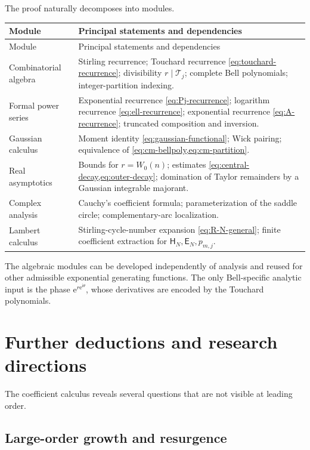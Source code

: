 \documentclass[11pt,a4paper]{article}
\theoremstyle{definition}
\theoremstyle{remark}
\newcommand{\Tch}{\mathscr T}
\newcommand{\ii}{\mathrm i}
\newcommand{\ee}{\mathrm e}
\newcommand{\cH}{\mathsf H}
\newcommand{\cE}{\mathsf E}
\begin{document}
The proof naturally decomposes into modules.
\begin{longtable}{p{}p{}}
\toprule
Module & Principal statements and dependencies\\
\midrule
\endfirsthead
\toprule
Module & Principal statements and dependencies\\
\midrule
\endhead
Combinatorial algebra & Stirling recurrence; Touchard recurrence
\cref{eq:touchard-recurrence}; divisibility \(r\mid\Tch_j\); complete Bell
polynomials; integer-partition indexing.\\[2pt]
Formal power series & Exponential recurrence \cref{eq:Pj-recurrence}; logarithm
recurrence \cref{eq:ell-recurrence}; exponential recurrence
\cref{eq:A-recurrence}; truncated composition and inversion.\\[2pt]
Gaussian calculus & Moment identity \cref{eq:gaussian-functional}; Wick pairing;
equivalence of \cref{eq:cm-bellpoly,eq:cm-partition}.\\[2pt]
Real asymptotics & Bounds for \(r=W_0(n)\); estimates
\cref{eq:central-decay,eq:outer-decay}; domination of Taylor remainders by a
Gaussian integrable majorant.\\[2pt]
Complex analysis & Cauchy's coefficient formula; parameterization of the
saddle circle; complementary-arc localization.\\[2pt]
Lambert calculus & Stirling-cycle-number expansion
\cref{eq:R-N-general}; finite coefficient extraction for
\(\cH_N,\cE_N,p_{m,j}\).\\
\bottomrule
\end{longtable}
The algebraic modules can be developed independently of analysis and reused
for other admissible exponential generating functions.  The only Bell-specific
analytic input is the phase \(\ee^{r\ee^{\ii\theta}}\), whose derivatives are
encoded by the Touchard polynomials.

\section{Further deductions and research directions}\label{sec:future}

The coefficient calculus reveals several questions that are not visible at
leading order.

\subsection{Large-order growth and resurgence}
\end{document}
